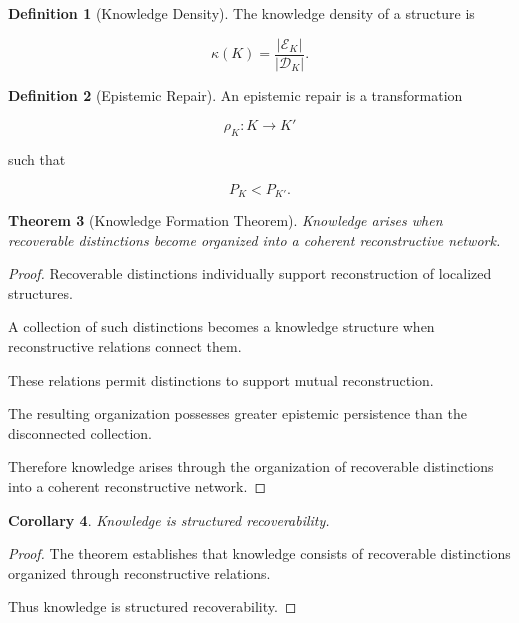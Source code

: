 \documentclass[12pt,oneside]{article}
\newtheorem{theorem}{Theorem}[section] \newtheorem{lemma}[theorem]{Lemma} \newtheorem{proposition}[theorem]{Proposition} \newtheorem{corollary}[theorem]{Corollary}
\theoremstyle{definition}
\newtheorem{definition}[theorem]{Definition} \newtheorem{axiom}[theorem]{Axiom} \newtheorem{remark}[theorem]{Remark} \newtheorem{example}[theorem]{Example}
\begin{document}
\begin{definition}[Knowledge Density]

The knowledge density of a structure is

\[
\kappa(K)
=
\frac{|\mathcal E_K|}
     {|\mathcal D_K|}.
\]

\end{definition}

\begin{definition}[Epistemic Repair]

An epistemic repair is a transformation

\[
\rho_K :
K
\rightarrow
K'
\]

such that

\[
P_K
<
P_{K'}.
\]

\end{definition}

\begin{theorem}[Knowledge Formation Theorem]

Knowledge arises when recoverable distinctions become organized into a coherent reconstructive network.

\end{theorem}

\begin{proof}

Recoverable distinctions individually support reconstruction of localized structures.

A collection of such distinctions becomes a knowledge structure when reconstructive relations connect them.

These relations permit distinctions to support mutual reconstruction.

The resulting organization possesses greater epistemic persistence than the disconnected collection.

Therefore knowledge arises through the organization of recoverable distinctions into a coherent reconstructive network.

\end{proof}

\begin{corollary}

Knowledge is structured recoverability.

\end{corollary}

\begin{proof}

The theorem establishes that knowledge consists of recoverable distinctions organized through reconstructive relations.

Thus knowledge is structured recoverability.

\end{proof}
\end{document}
